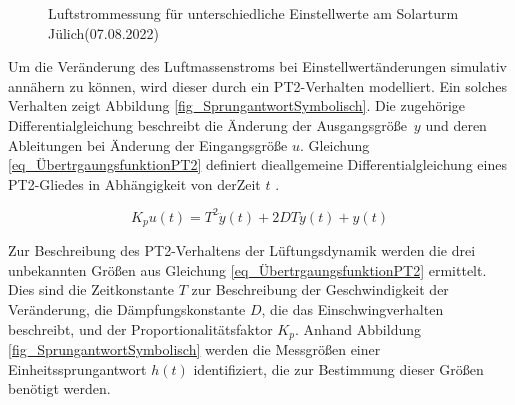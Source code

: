 \begin{figure}[h!]
    \centering
    \setlength{\fboxsep}{1pt}
    \setlength{\fboxrule}{1pt}
\caption[Luftstrommessung für unterschiedliche Einstellwerte am Solarturm Jülich\linebreak (07.08.2022)]{Luftstrommessung für unterschiedliche Einstellwerte am Solarturm Jülich\linebreak (07.08.2022)}
    \label{fig_LuftstromSolarturm}
\end{figure}

Um die Veränderung des Luftmassenstroms bei Einstellwertänderungen simulativ annähern zu können, wird dieser durch ein PT2-Verhalten modelliert.
Ein solches Verhalten zeigt Abbildung \ref{fig_SprungantwortSymbolisch}.
Die zugehörige Differentialgleichung beschreibt die Änderung der Ausgangsgröße~$y$ und deren Ableitungen bei Änderung der Eingangsgröße $u$.
Gleichung \ref{eq_ÜbertrgaungsfunktionPT2} definiert die\linebreak allgemeine Differentialgleichung eines PT2-Gliedes in Abhängigkeit von der\linebreak Zeit $t$ \cite[S.200]{Lunze}\cite[S.60]{ProfMueller}.

\begin{equation} \label{eq_ÜbertrgaungsfunktionPT2}
K_p u(t) = T^2 \ddot{y}(t)+2 D T \dot{y}(t)+y(t)
\end{equation}

Zur Beschreibung des PT2-Verhaltens der Lüftungsdynamik werden die drei unbekannten Größen aus Gleichung \ref{eq_ÜbertrgaungsfunktionPT2} ermittelt.
Dies sind die Zeitkonstante $T$ zur Beschreibung der Geschwindigkeit der Veränderung, die Dämpfungskonstante $D$, die das Einschwingverhalten beschreibt, und der Proportionalitätsfaktor $K_p$.
Anhand Abbildung \ref{fig_SprungantwortSymbolisch} werden die Messgrößen einer Einheitssprungantwort $h(t)$ identifiziert, die zur Bestimmung dieser Größen benötigt werden.\newpage

